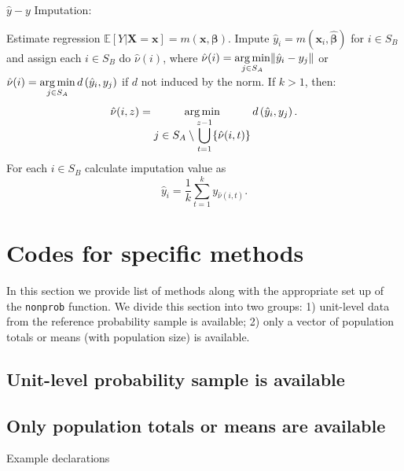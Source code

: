 \documentclass[
]{jss}
\begin{document}
\begin{algorithm}[ht!]
\caption{$\hat{y}-y$ Imputation:}
\label{algo-4}
\begin{algorithmic}[1]
\State Estimate regression $\mathbb{E}[Y|\boldsymbol{X}=\boldsymbol{x}]=m(\boldsymbol{x}, \boldsymbol{\beta})$.\;
\State Impute $\hat{y}_{i}=m\left(\boldsymbol{x}_{i},\hat{\boldsymbol{\beta}}\right)$ 
for $i \in S_{B}$ and assign each 
$i \in S_{B}$ do $\hat{\nu}(i)$, where
$\displaystyle \hat{\nu}(i)=
\operatornamewithlimits{arg\,min}_{j \in S_{A}}\lVert \hat{y}_{i}-y_{j}\rVert$ or
$\displaystyle \hat{\nu}(i)=
\operatornamewithlimits{arg\,min}_{j \in S_{A}}d\left(\hat{y}_{i},y_{j}\right)$ 
if $d$ not induced by the norm.\;
\State If $k>1$, then:
$$\hat{\nu}(i, z) = \operatornamewithlimits{arg\,min}_{\displaystyle j \in S_{A} \setminus \bigcup_{t=1}^{z-1}
\{\hat{\nu}(i, t)\}}
d\left(\hat{y}_{i},y_{j}\right).$$
\State For each $i \in S_B$ calculate imputation value as
$$
\hat{y}_i = \frac{1}{k}\sum_{t=1}^{k}y_{\hat{\nu}(i, t)}.
$$
\end{algorithmic}
\end{algorithm}

\clearpage

\section{Codes for specific methods}\label{sec-examples}

In this section we provide list of methods along with the appropriate
set up of the \texttt{nonprob} function. We divide this section into two
groups: 1) unit-level data from the reference probability sample is
available; 2) only a vector of population totals or means (with
population size) is available.

\subsection{Unit-level probability sample is
available}\label{unit-level-probability-sample-is-available}

\subsection{Only population totals or means are
available}\label{only-population-totals-or-means-are-available}

Example declarations
\end{document}
